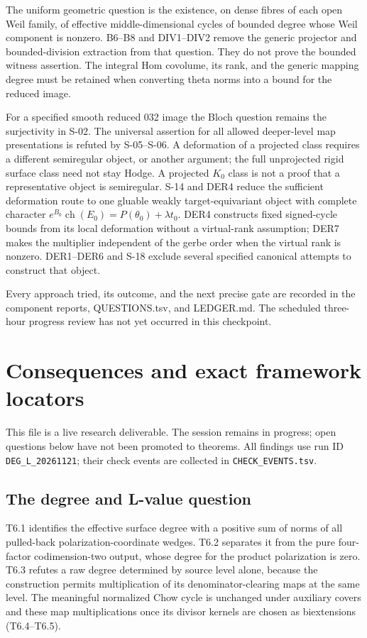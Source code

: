 \documentclass[11pt,a4paper]{article}
\theoremstyle{definition}
\begin{document}
The uniform geometric question is the existence, on dense fibres of each
open Weil family, of effective middle-dimensional cycles of bounded degree
whose Weil component is nonzero. B6--B8 and DIV1--DIV2 remove the generic
projector and bounded-division extraction from that question. They do not
prove the bounded witness assertion. The integral Hom covolume, its rank,
and the generic mapping degree must be retained when converting theta
norms into a bound for the reduced image.

For a specified smooth reduced 032 image the Bloch question remains the
surjectivity in S-02. The universal assertion for all allowed deeper-level
map presentations is refuted by S-05--S-06. A deformation of a projected
class requires a different semiregular object, or another argument; the
full unprojected rigid surface class need not stay Hodge. A projected
$K_0$ class is not a proof that a representative object is semiregular.
S-14 and DER4 reduce the sufficient deformation route to one gluable
weakly target-equivariant object with complete character
$e^{B_0}\operatorname{ch}(E_0)=P(\theta_0)+\lambda t_0$.
DER4 constructs fixed signed-cycle bounds from its local deformation
without a virtual-rank assumption; DER7 makes the multiplier independent
of the gerbe order when the virtual rank is nonzero. DER1--DER6 and
S-18 exclude several specified canonical attempts to construct that object.

Every approach tried, its outcome, and the next precise gate are recorded
in the component reports, QUESTIONS.tsv, and LEDGER.md. The scheduled
three-hour progress review has not yet occurred in this checkpoint.
\section{Consequences and exact framework locators}

This file is a live research deliverable. The session remains in
progress; open questions below have not been promoted to theorems. All
findings use run ID \texttt{DEG\_L\_20261121}; their check events are
collected in \texttt{CHECK\_EVENTS.tsv}.

\subsection{The degree and L-value
question}\label{the-degree-and-l-value-question}

T6.1 identifies the effective surface degree with a positive sum of
norms of all pulled-back polarization-coordinate wedges. T6.2 separates
it from the pure four-factor codimension-two output, whose degree for
the product polarization is zero. T6.3 refutes a raw degree determined
by source level alone, because the construction permits multiplication
of its denominator-clearing maps at the same level. The meaningful
normalized Chow cycle is unchanged under auxiliary covers and these map
multiplications once its divisor kernels are chosen as biextensions
(T6.4--T6.5).
\end{document}
